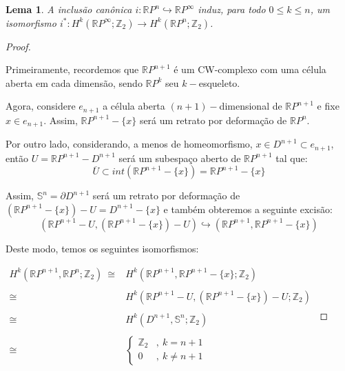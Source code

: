 \documentclass[12pt,oneside]{book} %
\newtheorem{lem}    {\hspace{0.5cm}Lema}[chapter]
\newcommand{\RP}{\mathbb{R}P}
\newcommand{\Z}{\mathbb{Z}}
\begin{document}
\begin{lem}\label{iso_proj}
	A inclusão canônica $i:\RP^{n}\hookrightarrow \RP^{\infty}$ induz, para todo $0\leq k\leq n$, um isomorfismo $i^{*}:H^{k}(\RP^{\infty};\Z_{2})\to H^{k}(\RP^{n};\Z_{2})$.
\end{lem}
\begin{proof}
	
	\
	
	\par Primeiramente, recordemos que $\RP^{n+1}$ é um CW-complexo com uma célula aberta em cada dimensão, sendo $\RP^{k}$ seu $k-$esqueleto.
	
	\par Agora, considere $e_{n+1}$ a célula aberta $(n+1)-$dimensional de $\RP^{n+1}$ e fixe $x\in e_{n+1}$. Assim, $\RP^{n+1}-\{ x \}$ será um retrato por deformação de $\RP^{n}$.
	
	\par Por outro lado, considerando, a menos de homeomorfismo, $x\in D^{n+1}\subset e_{n+1}$, então $U=\RP^{n+1}-D^{n+1}$ será um subespaço aberto de $\RP^{n+1}$ tal que:
	$$ \overline{U}\subset int(\RP^{n+1}-\{ x \})=\RP^{n+1}-\{ x \} $$
	
	\par Assim, $\mathbb{S}^{n}=\partial D^{n+1}$ será um retrato por deformação de $(\RP^{n+1}-\{ x \})-U=D^{n+1}-\{ x \}$ e também obteremos a seguinte excisão:
	$$ (\RP^{n+1}-U,(\RP^{n+1}-\{ x \})-U)\hookrightarrow (\RP^{n+1},\RP^{n+1}-\{ x \}) $$
	
	\par Deste modo, temos os seguintes isomorfismos: \newline
	
	$\begin{array}{rl}
		H^{k}(\RP^{n+1},\RP^{n};\Z_{2}) \ \cong & H^{k}(\RP^{n+1},\RP^{n+1}-\{ x \};\Z_{2}) \\
		& \\
		\cong & H^{k}(\RP^{n+1}-U,(\RP^{n+1}-\{ x \})-U;\Z_{2}) \\
		& \\
		\cong & H^{k}(D^{n+1},\mathbb{S}^{n};\Z_{2}) \\
		& \\
		\cong & \left\{ \begin{array}{cl}
			\Z_{2} & , \ k=n+1 \\
			0      & , \ k\neq n+1
		\end{array}\right.
	\end{array}$ \newline 
	

\end{proof}
\end{document}
